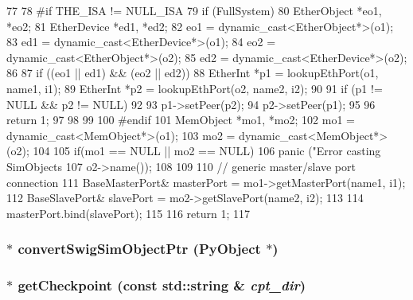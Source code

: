 \begin{DoxyCode}
77 {
78 #if THE_ISA != NULL_ISA
79     if (FullSystem) {
80         EtherObject *eo1, *eo2;
81         EtherDevice *ed1, *ed2;
82         eo1 = dynamic_cast<EtherObject*>(o1);
83         ed1 = dynamic_cast<EtherDevice*>(o1);
84         eo2 = dynamic_cast<EtherObject*>(o2);
85         ed2 = dynamic_cast<EtherDevice*>(o2);
86 
87         if ((eo1 || ed1) && (eo2 || ed2)) {
88             EtherInt *p1 = lookupEthPort(o1, name1, i1);
89             EtherInt *p2 = lookupEthPort(o2, name2, i2);
90 
91             if (p1 != NULL &&  p2 != NULL) {
92 
93                 p1->setPeer(p2);
94                 p2->setPeer(p1);
95 
96                 return 1;
97             }
98         }
99     }
100 #endif
101     MemObject *mo1, *mo2;
102     mo1 = dynamic_cast<MemObject*>(o1);
103     mo2 = dynamic_cast<MemObject*>(o2);
104 
105     if(mo1 == NULL || mo2 == NULL) {
106         panic ("Error casting SimObjects %
107                o2->name());
108     }
109 
110     // generic master/slave port connection
111     BaseMasterPort& masterPort = mo1->getMasterPort(name1, i1);
112     BaseSlavePort& slavePort   = mo2->getSlavePort(name2, i2);
113 
114     masterPort.bind(slavePort);
115 
116     return 1;
117 }
\end{DoxyCode}
\hypertarget{pyobject_8hh_a35bd8f1c38b15825afd59cae5bb0169e}{
\subsubsection[{convertSwigSimObjectPtr}]{$\ast$ convertSwigSimObjectPtr ({\bf PyObject} $\ast$)}}
\label{pyobject_8hh_a35bd8f1c38b15825afd59cae5bb0169e}
\hypertarget{pyobject_8hh_aac5019b5f736b89388804c7cb43bf754}{
\subsubsection[{getCheckpoint}]{$\ast$ getCheckpoint (const std::string \& {\em cpt\_\-dir})}}
\label{pyobject_8hh_aac5019b5f736b89388804c7cb43bf754}




